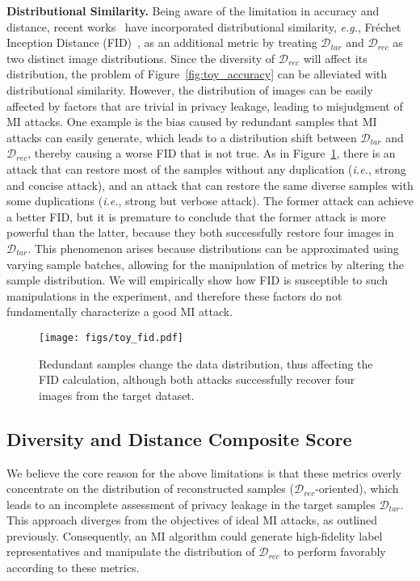 \noindent
\textbf{Distributional Similarity.}\quad
Being aware of the limitation in accuracy and distance, recent works~\cite{kedmi21iccv,vmi21nips,ppa22icml} have incorporated distributional similarity, \emph{e.g.}, Fr\'echet Inception Distance (FID)~\cite{fid}, as an additional metric by treating $\mathcal{D}_{tar}$ and $\mathcal{D}_{rec}$ as two distinct image distributions.
Since the diversity of $\mathcal{D}_{rec}$ will affect its distribution, the problem of Figure~\ref{fig:toy_accuracy} can be alleviated with distributional similarity.
However, the distribution of images can be easily affected by factors that are trivial in privacy leakage, leading to misjudgment of MI attacks.
One example is the bias caused by redundant samples that MI attacks can easily generate, which leads to a distribution shift between $\mathcal{D}_{tar}$ and $\mathcal{D}_{rec}$, thereby causing a worse FID that is not true.
As in Figure~\ref{fig:toy_fid}, there is an attack that can restore most of the samples without any duplication (\emph{i.e.}, strong and concise attack), and an attack that can restore the same diverse samples with some duplications (\emph{i.e.}, strong but verbose attack).
The former attack can achieve a better FID, but it is premature to conclude that the former attack is more powerful than the latter, because they both successfully restore four images in $\mathcal{D}_{tar}$.
This phenomenon arises because distributions can be approximated using varying sample batches, allowing for the manipulation of metrics by altering the sample distribution. We will empirically show how FID is susceptible to such manipulations in the experiment, and therefore these factors do not fundamentally characterize a good MI attack.

\begin{figure}[htb]%
	\centering
	\texttt{[image: figs/toy\_fid.pdf]}
  \vspace{-0.1in}
	\caption{Redundant samples change the data distribution, thus affecting the FID calculation, although both attacks successfully recover four images from the target dataset.}
	\label{fig:toy_fid}
 \vspace{-0.2in}
\end{figure}

\subsection{Diversity and Distance Composite Score}
\label{sec:ddcs:intro}
We believe the core reason for the above limitations is that these metrics overly concentrate on the distribution of reconstructed samples ($\mathcal{D}_{rec}$-oriented), which leads to an incomplete assessment of privacy leakage in the target samples $\mathcal{D}_{tar}$.
This approach diverges from the objectives of ideal MI attacks, as outlined previously.
Consequently, an MI algorithm could generate high-fidelity label representatives and manipulate the distribution of $\mathcal{D}_{rec}$ to perform favorably according to these metrics.

